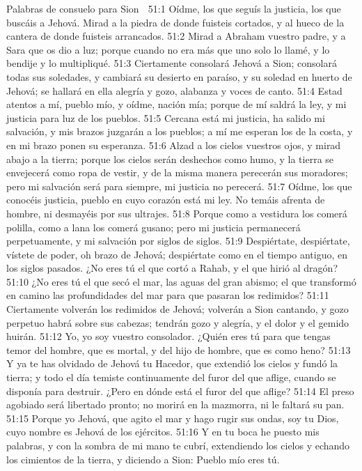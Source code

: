 Palabras de consuelo para Sion  

51:1 Oídme, los que seguís la justicia, los que buscáis a Jehová. Mirad a la piedra de donde fuisteis cortados, y al hueco de la cantera de donde fuisteis arrancados.  
51:2 Mirad a Abraham vuestro padre, y a Sara que os dio a luz; porque cuando no era más que uno solo lo llamé, y lo bendije y lo multipliqué.  
51:3 Ciertamente consolará Jehová a Sion; consolará todas sus soledades, y cambiará su desierto en paraíso, y su soledad en huerto de Jehová; se hallará en ella alegría y gozo, alabanza y voces de canto.  
51:4 Estad atentos a mí, pueblo mío, y oídme, nación mía; porque de mí saldrá la ley, y mi justicia para luz de los pueblos.  
51:5 Cercana está mi justicia, ha salido mi salvación, y mis brazos juzgarán a los pueblos; a mí me esperan los de la costa, y en mi brazo ponen su esperanza.  
51:6 Alzad a los cielos vuestros ojos, y mirad abajo a la tierra; porque los cielos serán deshechos como humo, y la tierra se envejecerá como ropa de vestir, y de la misma manera perecerán sus moradores; pero mi salvación será para siempre, mi justicia no perecerá.  
51:7 Oídme, los que conocéis justicia, pueblo en cuyo corazón está mi ley. No temáis afrenta de hombre, ni desmayéis por sus ultrajes.  
51:8 Porque como a vestidura los comerá polilla, como a lana los comerá gusano; pero mi justicia permanecerá perpetuamente, y mi salvación por siglos de siglos.  
51:9 Despiértate, despiértate, vístete de poder, oh brazo de Jehová; despiértate como en el tiempo antiguo, en los siglos pasados. ¿No eres tú el que cortó a Rahab, y el que hirió al dragón?  
51:10 ¿No eres tú el que secó el mar, las aguas del gran abismo; el que transformó en camino las profundidades del mar para que pasaran los redimidos?  
51:11 Ciertamente volverán los redimidos de Jehová; volverán a Sion cantando, y gozo perpetuo habrá sobre sus cabezas; tendrán gozo y alegría, y el dolor y el gemido huirán.  
51:12 Yo, yo soy vuestro consolador. ¿Quién eres tú para que tengas temor del hombre, que es mortal, y del hijo de hombre, que es como heno?  
51:13 Y ya te has olvidado de Jehová tu Hacedor, que extendió los cielos y fundó la tierra; y todo el día temiste continuamente del furor del que aflige, cuando se disponía para destruir. ¿Pero en dónde está el furor del que aflige?  
51:14 El preso agobiado será libertado pronto; no morirá en la mazmorra, ni le faltará su pan.  
51:15 Porque yo Jehová, que agito el mar y hago rugir sus ondas, soy tu Dios, cuyo nombre es Jehová de los ejércitos.  
51:16 Y en tu boca he puesto mis palabras, y con la sombra de mi mano te cubrí, extendiendo los cielos y echando los cimientos de la tierra, y diciendo a Sion: Pueblo mío eres tú.  
